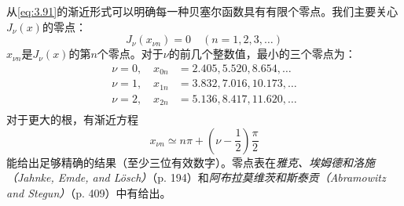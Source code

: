 \documentclass[12pt]{book}
\numberwithin{equation}{chapter}
\numberwithin{figure}{chapter}
\numberwithin{footnote}{page}
\begin{document}
从\autoref{eq:3.91}的渐近形式可以明确每一种贝塞尔函数具有有限个零点。我们主要关心$J_\nu(x)$的零点：
\begin{equation}\label{eq:3.92}
    J_\nu(x_{\nu n})=0\quad(n=1,2,3,\dots)
\end{equation}
$x_{\nu n}$是$J_\nu(x)$的第$n$个零点。对于$\nu$的前几个整数值，最小的三个零点为：
$$\begin{aligned}
    \nu=0,\quad x_{0n}&=2.405,5.520,8.654,\dots\\
    \nu=1,\quad x_{1n}&=3.832,7.016,10.173,\dots\\
    \nu=2,\quad x_{2n}&=5.136,8.417,11.620,\dots\\
\end{aligned}$$
对于更大的根，有渐近方程
$$x_{\nu n}\simeq n\pi+(\nu-\frac{1}{2})\frac{\pi}{2}$$
能给出足够精确的结果（至少三位有效数字）。零点表在\textit{雅克、埃姆德和洛施（Jahnke, Emde, and Lösch）}（p. 194）和\textit{阿布拉莫维茨和斯泰贡（Abramowitz and Stegun）}（p. 409）中有给出。
\end{document}
